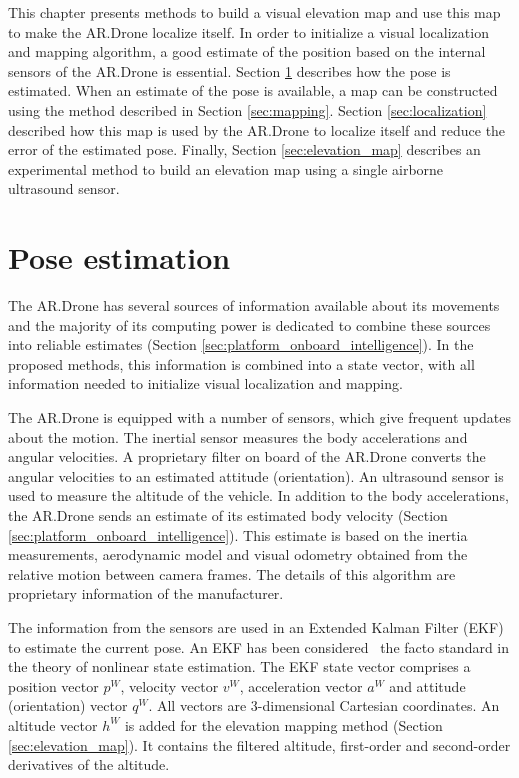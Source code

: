 This chapter presents methods to build a visual elevation map and use this map to make the AR.Drone localize itself.
In order to initialize a visual localization and mapping algorithm, a good estimate of the position based on the internal sensors of the AR.Drone is essential.
Section \ref{sec:pose_estimation} describes how the pose is estimated.
When an estimate of the pose is available, a map can be constructed using the method described in Section \ref{sec:mapping}.
Section \ref{sec:localization} described how this map is used by the AR.Drone to localize itself and reduce the error of the estimated pose.
Finally, Section \ref{sec:elevation_map} describes an experimental method to build an elevation map using a single airborne ultrasound sensor.

	\section{Pose estimation}
	\label{sec:pose_estimation}
The AR.Drone has several sources of information available about its movements and the majority of its computing power is dedicated to combine these sources into reliable estimates (Section \ref{sec:platform_onboard_intelligence}). In the proposed methods, this information is combined into a state vector, with all information needed to initialize visual localization and mapping.

The AR.Drone is equipped with a number of sensors, which give frequent updates about the motion. 
The inertial sensor measures the body accelerations and angular velocities.
A proprietary filter on board of the AR.Drone converts the angular velocities to an estimated attitude (orientation).
An ultrasound sensor is used to measure the altitude of the vehicle.
In addition to the body accelerations, the AR.Drone sends an estimate of its estimated body velocity (Section \ref{sec:platform_onboard_intelligence}).
This estimate is based on the inertia measurements, aerodynamic model and visual odometry obtained from the relative motion between camera frames.
The details of this algorithm are proprietary information of the manufacturer. 

The information from the sensors are used in an Extended Kalman Filter (EKF) to estimate the current pose.
An EKF has been considered~\cite{julier2004unscented} the facto standard in the theory of nonlinear state estimation.
The EKF state vector comprises a position vector $p^{W}$, velocity vector $v^{W}$, acceleration vector $a^{W}$ and attitude (orientation) vector $q^{W}$.
All vectors are 3-dimensional Cartesian coordinates.
An altitude vector $h^W$ is added for the elevation mapping method (Section \ref{sec:elevation_map}). It contains the filtered altitude, first-order and second-order derivatives of the altitude.

